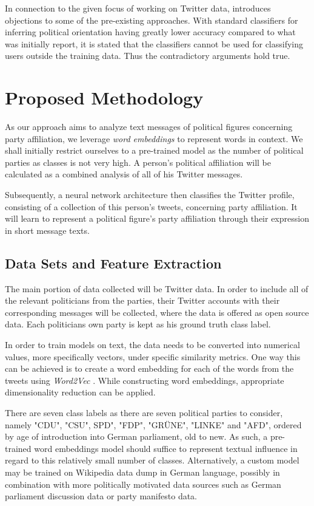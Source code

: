 \documentclass[10pt, oneside]{article}
\begin{document}
\begin{multicols}{2}
In connection to the given focus of working on Twitter data, \cite{Cohen2013} introduces objections to some of the pre-existing approaches. With standard classifiers for inferring political orientation having greatly lower accuracy compared to what was initially report, it is stated that the classifiers cannot be used for classifying users outside the training data. Thus the contradictory arguments hold true.


\section{Proposed Methodology}

As our approach aims to analyze text messages of political figures concerning party affiliation, we leverage \textit{word embeddings} to represent words in context. We shall initially restrict ourselves to a pre-trained model as the number of political parties as classes is not very high. A person's political affiliation will be calculated as a combined analysis of all of his Twitter messages.

Subsequently, a neural network architecture then classifies the Twitter profile, consisting of a collection of this person's tweets, concerning party affiliation. It will learn to represent a political figure's party affiliation through their expression in short message texts.

\subsection{Data Sets and Feature Extraction} 

The main portion of data collected will be Twitter data. In order to include all of the relevant politicians from the parties, their Twitter accounts with their corresponding messages will be collected, where the data is offered as open source data.
Each politicians own party is kept as his ground truth class label.

In order to train models on text, the data needs to be converted into numerical values, more specifically vectors, under specific similarity metrics. One way this can be achieved is to create a word embedding for each of the words from the tweets using \textit{Word2Vec} \cite{DBLP:journals/corr/abs-1301-3781}. While constructing word embeddings, appropriate dimensionality reduction can be applied.

There are seven class labels as there are seven political parties to consider, namely "CDU", "CSU", SPD", "FDP", "GRÜNE", "LINKE" and "AFD", ordered by age of introduction into German parliament, old to new. As such, a pre-trained word embeddings model should suffice to represent textual influence in regard to this relatively small number of classes.
Alternatively, a custom model may be trained on Wikipedia data dump in German language, possibly in combination with more politically motivated data sources such as German parliament discussion data or party manifesto data. 


\end{multicols}
\end{document}
